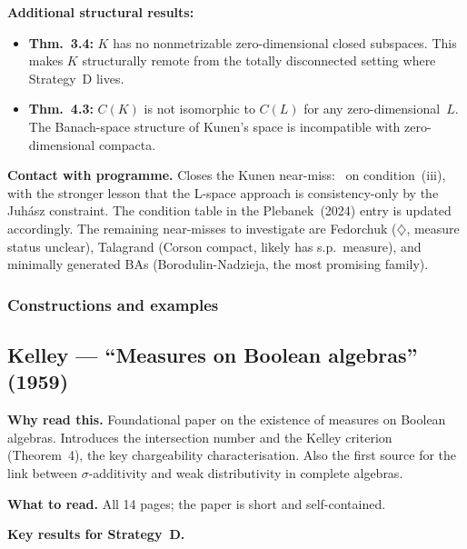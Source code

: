 \medskip\noindent
\textbf{Additional structural results:}
\begin{itemize}[nosep]
  \item \textbf{Thm.~3.4:} $K$ has no nonmetrizable zero-dimensional
    closed subspaces.  This makes $K$ structurally remote from the
    totally disconnected setting where Strategy~D lives.
  \item \textbf{Thm.~4.3:} $C(K)$ is not isomorphic to $C(L)$ for
    any zero-dimensional~$L$.  The Banach-space structure of Kunen's
    space is incompatible with zero-dimensional compacta.
\end{itemize}

\medskip\noindent
\textbf{Contact with programme.}  Closes the Kunen near-miss:
\texttimes\ on condition~(iii), with the stronger lesson that the
L-space approach is consistency-only by the Juh\'{a}sz constraint.
The condition table in the Plebanek~(2024) entry is updated
accordingly.  The remaining near-misses to investigate are Fedorchuk
($\diamondsuit$, measure status unclear), Talagrand (Corson compact,
likely has s.p.\ measure), and minimally generated BAs
(Borodulin-Nadzieja, the most promising family).

\subsubsection{Constructions and examples}

\subsection*{Kelley --- ``Measures on Boolean algebras'' (1959)}

\textbf{Why read this.}  Foundational paper on the existence of
measures on Boolean algebras.  Introduces the intersection number
and the Kelley criterion (Theorem~4), the key chargeability
characterisation.  Also the first source for the link between
$\sigma$-additivity and weak distributivity in complete algebras.

\medskip\noindent
\textbf{What to read.}  All 14 pages; the paper is short and
self-contained.

\medskip\noindent
\textbf{Key results for Strategy~D.}

